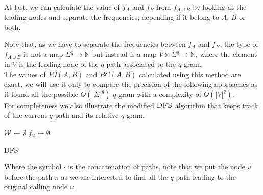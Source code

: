 	At last, we can calculate the value of $f_{A}$ and $f_{B}$ from $f_{A \cup B}$ by looking at the leading nodes and separate the frequencies, 
	depending if it belong to $A$, $B$ or both.

	Note that, as we have to separate the frequencies between $f_{A}$ and $f_{B}$, the type of $f_{A \cup B}$ is not a map $ \Sigma^{q} \rightarrow \mathbb{N}$
	but instead is a map $V \times \Sigma^{q} \rightarrow \mathbb{N}$, where the element in $V$ is the leading node of the $q$-path associated to the $q$-gram.\\ 
	
	The values of $FJ(A,B)$ and $BC(A,B)$ calculated using this method are exact, we will use it only to compare the precision of the following approaches as it found all the possible $O(|\Sigma|^{q})$ $q$-gram with a complexity of $O(|V|^{q})$.\\
	
	For completeness we also illustrate the modified $\textsc{DFS}$ algorithm that keeps track of the current $q$-path and its relative $q$-gram.
	
    \begin{algorithm}[h]
		\small
		\DontPrintSemicolon
		\BlankLine
		$\mathcal{W} \gets \emptyset$\;
		$f_{u} \gets \emptyset$ \quad \;    
		\BlankLine
		\BlankLine
		\caption{\textsc{DFS}}
		\label{alg:brute-force}
	\end{algorithm}

	Where the symbol $\cdot$ is the concatenation of paths, note that we put the node $v$ before the path $\pi$ as we are interested to find all the $q$-path leading to the original calling node $u$.\\
	
